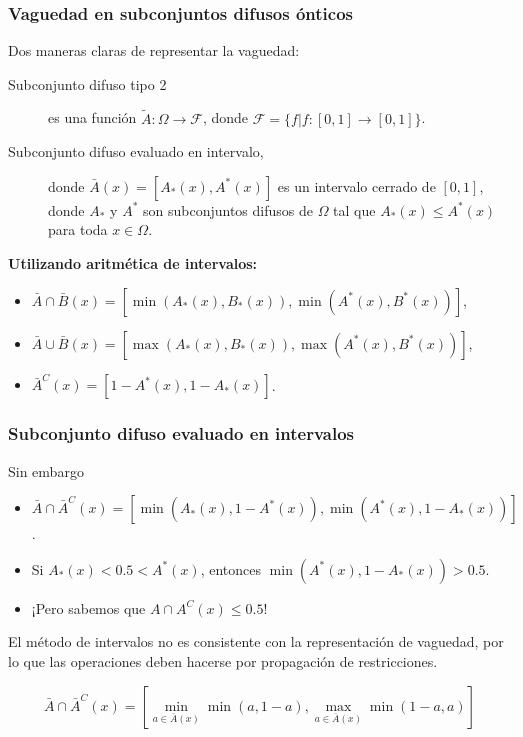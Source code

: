 \documentclass{beamer}
\theoremstyle{definition}
\begin{document}
\begin{frame}
  \frametitle{Vaguedad en subconjuntos difusos ónticos}
  Dos maneras claras de representar la vaguedad:

  \begin{description}
  \item[Subconjunto difuso tipo 2] es una función
    $\tilde{A}: \Omega \to \mathcal{F}$, donde
    $\mathcal{F} = \{f | f: [0, 1] \to [0, 1]\}$.
  \item[Subconjunto difuso evaluado en intervalo,] donde $\bar{A}(x) =
    [A_*(x), A^*(x)]$ es un intervalo
    cerrado de $[0, 1]$, donde $A_*$ y $A^*$
    son subconjuntos difusos de $\Omega$ tal que $A_*(x) \leq A^*(x)$
    para toda $x \in \Omega$. 
  \end{description}

\textbf{Utilizando aritmética de intervalos:}
  \begin{itemize}
  \item $\bar{A} \cap \bar{B} (x) = [\min(A_*(x), B_*(x)), \min(A^*(x), B^*(x))]$,
  \item $\bar{A} \cup \bar{B} (x) = [\max(A_*(x), B_*(x)), \max(A^*(x), B^*(x))]$,
  \item $\bar{A}^C(x) = [1 - A^*(x), 1 - A_*(x)]$. 
  \end{itemize}

\end{frame}

\begin{frame}
  \frametitle{Subconjunto difuso evaluado en intervalos}

Sin embargo
\begin{itemize}
\item $\bar{A} \cap \bar{A}^C(x) = [\min(A_*(x), 1 - A^*(x)),
  \min(A^*(x), 1 - A_*(x))]$.
\item Si $A_*(x) < 0.5 < A^*(x)$, entonces $\min(A^*(x), 1 - A_*(x)) >
  0.5$. 
\item ¡Pero sabemos que $A \cap A^C (x) \leq 0.5$!
\end{itemize}

\begin{center}
  \alert{El método de intervalos no es consistente con la
    representación de vaguedad, por lo que las operaciones deben
    hacerse por propagación de restricciones.}

$$
\bar{A} \cap \bar{A}^C (x) = [\min_{a \in \bar{A}(x)} \min(a, 1 - a),
  \max_{a \in \bar{A}(x)} \min(1 - a, a) ]
$$

\end{center}

\end{frame}
\end{document}
